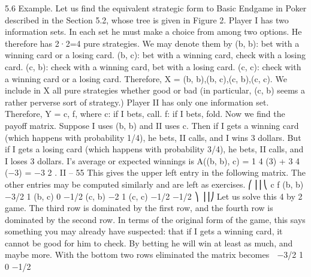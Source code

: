 5.6 Example. Let us find the equivalent strategic form to Basic Endgame in Poker
described in the Section 5.2, whose tree is given in Figure 2. Player I has two information
sets. In each set he must make a choice from among two options. He therefore has 2·2=4
pure strategies. We may denote them by
(b, b): bet with a winning card or a losing card.
(b, c): bet with a winning card, check with a losing card.
(c, b): check with a winning card, bet with a losing card.
(c, c): check with a winning card or a losing card.
Therefore, X = {(b, b),(b, c),(c, b),(c, c)}. We include in X all pure strategies whether
good or bad (in particular, (c, b) seems a rather perverse sort of strategy.)
Player II has only one information set. Therefore, Y = {c, f}, where
c: if I bets, call.
f: if I bets, fold.
Now we find the payoff matrix. Suppose I uses (b, b) and II uses c. Then if I gets a
winning card (which happens with probability 1/4), he bets, II calls, and I wins 3 dollars.
But if I gets a losing card (which happens with probability 3/4), he bets, II calls, and I
loses 3 dollars. I’s average or expected winnings is
A((b, b), c) = 1
4
(3) + 3
4
(−3) = −3
2
.
II – 55
This gives the upper left entry in the following matrix. The other entries may be computed
similarly and are left as exercises.
⎛
⎜⎜⎝
c f
(b, b) −3/2 1
(b, c) 0 −1/2
(c, b) −2 1
(c, c) −1/2 −1/2
⎞
⎟⎟⎠
Let us solve this 4 by 2 game. The third row is dominated by the first row, and the
fourth row is dominated by the second row. In terms of the original form of the game, this
says something you may already have suspected: that if I gets a winning card, it cannot
be good for him to check. By betting he will win at least as much, and maybe more. With
the bottom two rows eliminated the matrix becomes  −3/2 1
0 −1/2

